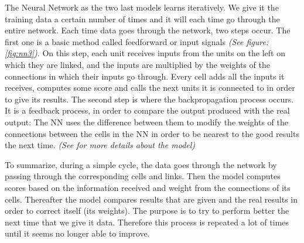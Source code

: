\documentclass[a4]{article}
\begin{document}
The Neural Network as the two last models learns iteratively. We give it the training data a certain number of times and it will each time go through the entire network. Each time data goes through the network, two steps occur. The first one is a basic method called feedforward or input signals \textit{(See figure: \ref{fig:nn3})}. On this step, each unit receives inputs from the units on the left on which they are linked, and the inputs are multiplied by the weights of the connections in which their inputs go through. Every cell adds all the inputs it receives, computes some score and calls the next units it is connected to in order to give its results. The second step is where the backpropagation process occurs. It is a feedback process, in order to compare the output produced with the real output: The NN uses the difference between them to modify the weights of the connections between the cells in the NN in order to be nearest to the good results the next time. \textit{(See \cite{woodford} for more details about the model)}

To summarize, during a simple cycle, the data goes through the network by passing through the corresponding cells and links. Then the model computes scores based on the information received and weight from the connections of its cells. Thereafter the model compares results that are given and the real results in order to correct itself (its weights). The purpose is to try to perform better the next time that we give it data. Therefore this process is repeated a lot of times until it seems no longer able to improve.
\end{document}
